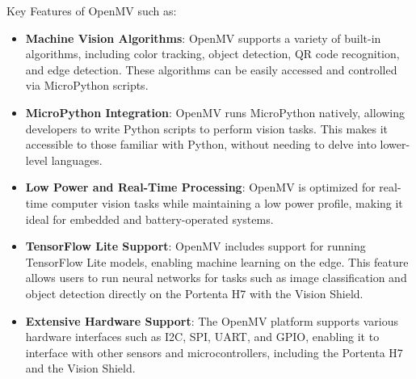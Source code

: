 Key Features of OpenMV such as:
\begin{itemize} 
	\item \textbf{Machine Vision Algorithms}: OpenMV supports a variety of built-in algorithms, including color tracking, object detection, QR code recognition, and edge detection. These algorithms can be easily accessed and controlled via MicroPython scripts. 
	\item \textbf{MicroPython Integration}: OpenMV runs MicroPython natively, allowing developers to write Python scripts to perform vision tasks. This makes it accessible to those familiar with Python, without needing to delve into lower-level languages.
	\item \textbf{Low Power and Real-Time Processing}: OpenMV is optimized for real-time computer vision tasks while maintaining a low power profile, making it ideal for embedded and battery-operated systems. 
	\item \textbf{TensorFlow Lite Support}: OpenMV includes support for running TensorFlow Lite models, enabling machine learning on the edge. This feature allows users to run neural networks for tasks such as image classification and object detection directly on the Portenta H7 with the Vision Shield. 
	\item \textbf{Extensive Hardware Support}: The OpenMV platform supports various hardware interfaces such as I2C, SPI, UART, and GPIO, enabling it to interface with other sensors and microcontrollers, including the Portenta H7 and the Vision Shield. 
\end{itemize}

